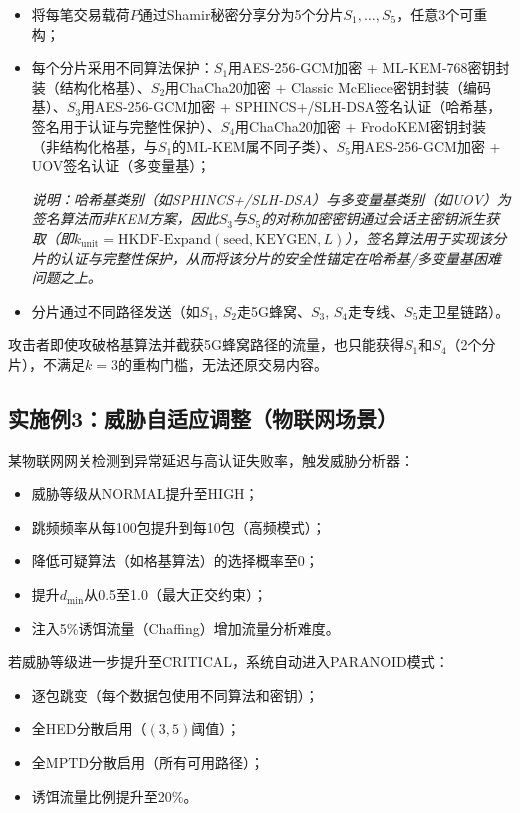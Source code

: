 ﻿\documentclass[12pt,a4paper]{article}
\begin{document}
\begin{itemize}
    \item 将每笔交易载荷$P$通过Shamir秘密分享分为5个分片$S_1, \ldots, S_5$，任意3个可重构；
    \item 每个分片采用不同算法保护：$S_1$用AES-256-GCM加密 + ML-KEM-768密钥封装（结构化格基）、$S_2$用ChaCha20加密 + Classic McEliece密钥封装（编码基）、$S_3$用AES-256-GCM加密 + SPHINCS+/SLH-DSA签名认证（哈希基，签名用于认证与完整性保护）、$S_4$用ChaCha20加密 + FrodoKEM密钥封装（非结构化格基，与$S_1$的ML-KEM属不同子类）、$S_5$用AES-256-GCM加密 + UOV签名认证（多变量基）；

    \textit{说明：哈希基类别（如SPHINCS+/SLH-DSA）与多变量基类别（如UOV）为签名算法而非KEM方案，因此$S_3$与$S_5$的对称加密密钥通过会话主密钥派生获取（即$k_{\text{unit}} = \text{HKDF-Expand}(\text{seed}, \text{KEYGEN}, L)$），签名算法用于实现该分片的认证与完整性保护，从而将该分片的安全性锚定在哈希基/多变量基困难问题之上。}
    \item 分片通过不同路径发送（如$S_1$, $S_2$走5G蜂窝、$S_3$, $S_4$走专线、$S_5$走卫星链路）。
\end{itemize}

攻击者即使攻破格基算法并截获5G蜂窝路径的流量，也只能获得$S_1$和$S_4$（2个分片），不满足$k=3$的重构门槛，无法还原交易内容。

\subsection*{实施例3：威胁自适应调整（物联网场景）}

某物联网网关检测到异常延迟与高认证失败率，触发威胁分析器：

\begin{itemize}
    \item 威胁等级从NORMAL提升至HIGH；
    \item 跳频频率从每100包提升到每10包（高频模式）；
    \item 降低可疑算法（如格基算法）的选择概率至0；
    \item 提升$d_{\min}$从0.5至1.0（最大正交约束）；
    \item 注入5\%诱饵流量（Chaffing）增加流量分析难度。
\end{itemize}

若威胁等级进一步提升至CRITICAL，系统自动进入PARANOID模式：
\begin{itemize}
    \item 逐包跳变（每个数据包使用不同算法和密钥）；
    \item 全HED分散启用（$(3,5)$阈值）；
    \item 全MPTD分散启用（所有可用路径）；
    \item 诱饵流量比例提升至20\%。
\end{itemize}
\end{document}
